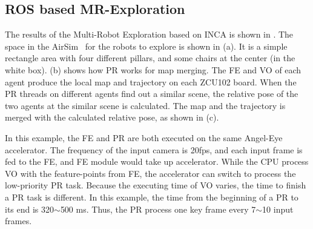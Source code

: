 

\subsection{ ROS based MR-Exploration }

The results of the Multi-Robot Exploration based on INCA is shown in . The space in the AirSim~\cite{shah2018airsim} for the robots to explore is shown in (a). It is a simple rectangle area with four different pillars, and some chairs at the center (in the white box).  (b) shows how PR works for map merging. The FE and VO of each agent produce the local map and trajectory on each ZCU102 board. When the PR threads on different agents find out a similar scene, the relative pose of the two agents at the similar scene is calculated. The map and the trajectory is merged with the calculated relative pose, as shown in (c).

In this example, the FE and PR are both executed on the same Angel-Eye accelerator. The frequency of the input camera is 20fps, and each input frame is fed to the FE, and FE module would take up accelerator. While the CPU process VO with the feature-points from FE, the accelerator can switch to process the low-priority PR task. Because the executing time of VO varies, the time to finish a PR task is different. In this example, the time from the beginning of a PR to its end is 320$\sim$500 ms. Thus, the PR process one key frame every 7$\sim$10 input frames.
